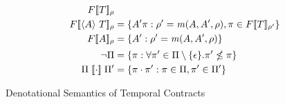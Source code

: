 {\begin{align*}
{        \denotetconfulle{\mtcon}{\menv}}
      \\
     \denotetconfulle{\stbind{\mevent}{\mtcon}}{\menv} &=
     \setbuild{\mevent' \mtrace}{\menv' = \matches(\mevent, \mevent',
       \menv), \mtrace \in \denotetconfulle{\mtcon}{\menv'}}
     \\
      \denotetconfulle{\mevent}{\menv} &= \setbuild{\mevent'}{\menv' =
        \matches(\mevent, \mevent', \menv)}
      \\[2pt]
      \semneg{\Pi} &= \setbuild{\mtrace}{\forall \mtrace' \in
        \Pi\setminus\setof{\epsilon}. \mtrace' \nleq \mtrace}
      \\
      \Pi \semseq \Pi' &= \setbuild{\mtrace \cdot \mtrace'}{\mtrace
        \in \Pi, \mtrace' \in \Pi'}
    \end{align*}}{\caption{Denotational Semantics of Temporal Contracts}\label{fig:tcontract-denotation}}
